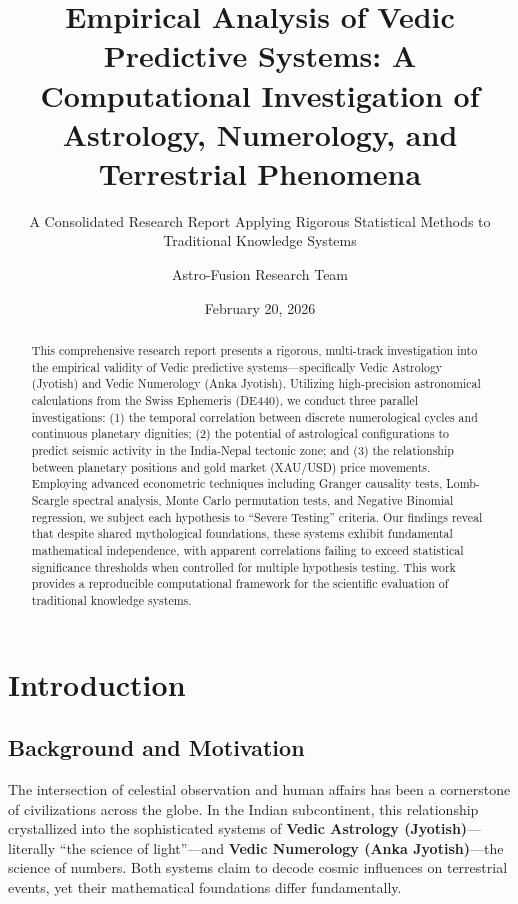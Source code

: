 \documentclass[
  11pt,
  a4paper,
  oneside,
  openany]{article}
\title{Empirical Analysis of Vedic Predictive Systems: A Computational
Investigation of Astrology, Numerology, and Terrestrial Phenomena}
\subtitle{A Consolidated Research Report Applying Rigorous Statistical
Methods to Traditional Knowledge Systems}
\author{Astro-Fusion Research Team}
\date{February 20, 2026}
\renewcommand*\contentsname{Table of contents}
\newcommand\contentsname{Table of contents}
\begin{document}
\maketitle
\begin{abstract}
This comprehensive research report presents a rigorous, multi-track
investigation into the empirical validity of Vedic predictive
systems---specifically Vedic Astrology (Jyotish) and Vedic Numerology
(Anka Jyotish). Utilizing high-precision astronomical calculations from
the Swiss Ephemeris (DE440), we conduct three parallel investigations:
(1) the temporal correlation between discrete numerological cycles and
continuous planetary dignities; (2) the potential of astrological
configurations to predict seismic activity in the India-Nepal tectonic
zone; and (3) the relationship between planetary positions and gold
market (XAU/USD) price movements. Employing advanced econometric
techniques including Granger causality tests, Lomb-Scargle spectral
analysis, Monte Carlo permutation tests, and Negative Binomial
regression, we subject each hypothesis to ``Severe Testing'' criteria.
Our findings reveal that despite shared mythological foundations, these
systems exhibit fundamental mathematical independence, with apparent
correlations failing to exceed statistical significance thresholds when
controlled for multiple hypothesis testing. This work provides a
reproducible computational framework for the scientific evaluation of
traditional knowledge systems.
\end{abstract}

\renewcommand*\contentsname{Table of contents}
{
\hypersetup{linkcolor=}
\setcounter{tocdepth}{3}
\tableofcontents
}
\listoffigures
\listoftables
{}
\section{Introduction}\label{introduction}

\subsection{Background and Motivation}\label{background-and-motivation}

The intersection of celestial observation and human affairs has been a
cornerstone of civilizations across the globe. In the Indian
subcontinent, this relationship crystallized into the sophisticated
systems of \textbf{Vedic Astrology (Jyotish)}---literally ``the science
of light''---and \textbf{Vedic Numerology (Anka Jyotish)}---the science
of numbers. Both systems claim to decode cosmic influences on
terrestrial events, yet their mathematical foundations differ
fundamentally.
\end{document}
